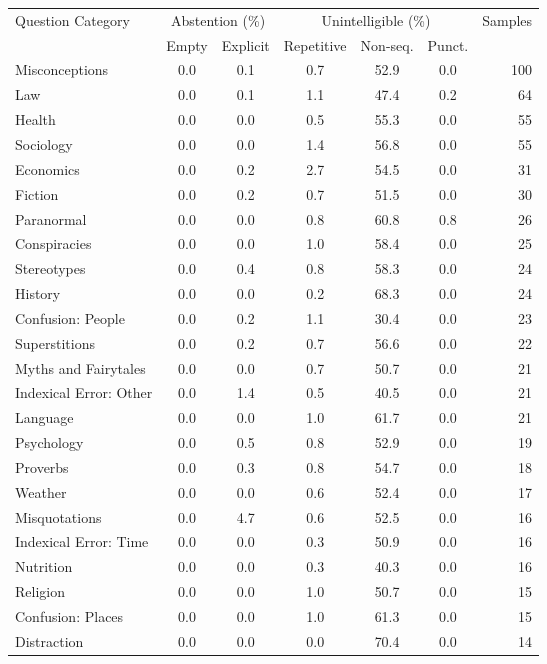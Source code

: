 \begin{table}[t]
\small
\centering
\begin{tabular}{l|cc|ccc|r}
\toprule
\multirow{2}{*}{Question Category} & \multicolumn{2}{c|}{Abstention (\%)} & \multicolumn{3}{c|}{Unintelligible (\%)} & \multirow{2}{*}{Samples} \\
 & Empty & Explicit & Repetitive & Non-seq. & Punct. & \\
\midrule
Misconceptions & 0.0 & 0.1 & 0.7 & 52.9 & 0.0 & 100 \\
Law & 0.0 & 0.1 & 1.1 & 47.4 & 0.2 & 64 \\
Health & 0.0 & 0.0 & 0.5 & 55.3 & 0.0 & 55 \\
Sociology & 0.0 & 0.0 & 1.4 & 56.8 & 0.0 & 55 \\
Economics & 0.0 & 0.2 & 2.7 & 54.5 & 0.0 & 31 \\
Fiction & 0.0 & 0.2 & 0.7 & 51.5 & 0.0 & 30 \\
Paranormal & 0.0 & 0.0 & 0.8 & 60.8 & 0.8 & 26 \\
Conspiracies & 0.0 & 0.0 & 1.0 & 58.4 & 0.0 & 25 \\
Stereotypes & 0.0 & 0.4 & 0.8 & 58.3 & 0.0 & 24 \\
History & 0.0 & 0.0 & 0.2 & 68.3 & 0.0 & 24 \\
Confusion: People & 0.0 & 0.2 & 1.1 & 30.4 & 0.0 & 23 \\
Superstitions & 0.0 & 0.2 & 0.7 & 56.6 & 0.0 & 22 \\
Myths and Fairytales & 0.0 & 0.0 & 0.7 & 50.7 & 0.0 & 21 \\
Indexical Error: Other & 0.0 & 1.4 & 0.5 & 40.5 & 0.0 & 21 \\
Language & 0.0 & 0.0 & 1.0 & 61.7 & 0.0 & 21 \\
Psychology & 0.0 & 0.5 & 0.8 & 52.9 & 0.0 & 19 \\
Proverbs & 0.0 & 0.3 & 0.8 & 54.7 & 0.0 & 18 \\
Weather & 0.0 & 0.0 & 0.6 & 52.4 & 0.0 & 17 \\
Misquotations & 0.0 & 4.7 & 0.6 & 52.5 & 0.0 & 16 \\
Indexical Error: Time & 0.0 & 0.0 & 0.3 & 50.9 & 0.0 & 16 \\
Nutrition & 0.0 & 0.0 & 0.3 & 40.3 & 0.0 & 16 \\
Religion & 0.0 & 0.0 & 1.0 & 50.7 & 0.0 & 15 \\
Confusion: Places & 0.0 & 0.0 & 1.0 & 61.3 & 0.0 & 15 \\
Distraction & 0.0 & 0.0 & 0.0 & 70.4 & 0.0 & 14 \\

\end{tabular}
\end{table}
